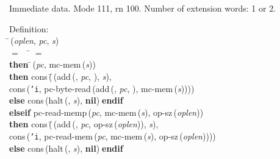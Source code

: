  Immediate data. Mode 111, rn 100.
 Number of extension words: 1 or 2.
\begin{tabbing}{\sc Definition}: \\  
\=\,({\it{oplen\/}}, {\it{pc\/}}, {\it{s\/}}) \\ 
$=$$\;\;\;\;$\= $=$ {} \\ 
{\bf then }\=\,({\it{pc\/}}, {\rm{mc-mem}}\,({\it{s\/}})) \\ 
{\bf then }{\rm{cons}}\,(\=\,({\rm{add}}\,({}, {\it{pc\/}}, {}), {\it{s\/}}), \\ 
{\rm{cons}}\,({\tt{'}}{\tt{i}}, {\rm{pc-byte-read}}\,({\rm{add}}\,({}, {\it{pc\/}}, {}), {\rm{mc-mem}}\,({\it{s\/}}))))\- \\ 
{\bf else }{\rm{cons}}\,({\rm{halt}}\,({}, {\it{s\/}}), {\bf{nil}})$\;${\bf  endif}\- \\ 
{\bf elseif }{\rm{pc-read-memp}}\,({\it{pc\/}}, {\rm{mc-mem}}\,({\it{s\/}}), {\rm{op-sz}}\,({\it{oplen\/}})) \\ 
{\bf then }{\rm{cons}}\,(\=\,({\rm{add}}\,({}, {\it{pc\/}}, {\rm{op-sz}}\,({\it{oplen\/}})), {\it{s\/}}), \\ 
{\rm{cons}}\,({\tt{'}}{\tt{i}}, {\rm{pc-read-mem}}\,({\it{pc\/}}, {\rm{mc-mem}}\,({\it{s\/}}), {\rm{op-sz}}\,({\it{oplen\/}}))))\- \\ 
{\bf else }{\rm{cons}}\,({\rm{halt}}\,({}, {\it{s\/}}), {\bf{nil}})$\;${\bf  endif}\-\-
\end{tabbing}

